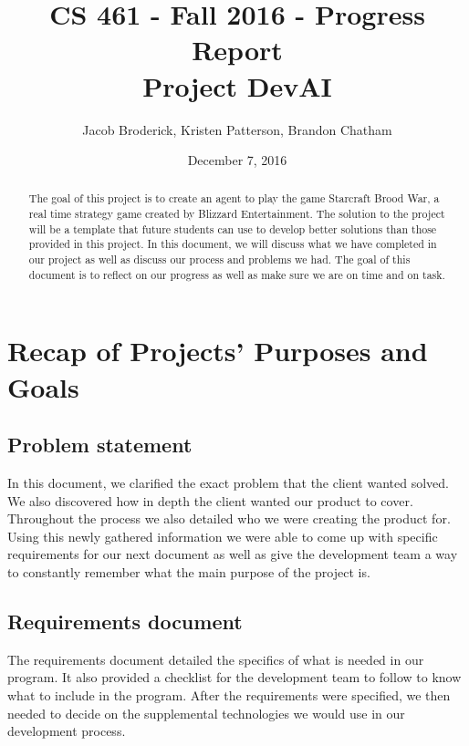 \documentclass[10pt,letterpaper,onecolumn,draftclsnofoot]{IEEEtran}
\begin{document}
\begin{titlepage}

  \title{CS 461 - Fall 2016 - Progress Report \\ Project DevAI}
  \author{Jacob Broderick, Kristen Patterson, Brandon Chatham}
  \date{December 7, 2016}
  \maketitle
  \vspace{4cm}
  \begin{abstract}
  	\noindent 
  	  	\noindent
	The goal of this project is to create an agent to play the game Starcraft Brood War, a real time strategy game created by Blizzard Entertainment. The solution to the project will be a template that future students can use to develop better solutions than those provided in this project. In this document, we will discuss what we have completed in our project as well as discuss our process and problems we had. The goal of this document is to reflect on our progress as well as make sure we are on time and on task.
   \end{abstract}
\end{titlepage}

\section{Recap of Projects' Purposes and Goals}
\subsection{Problem statement}
In this document, we clarified the exact problem that the client wanted solved. We also discovered how in depth the client wanted our product to cover. Throughout the process we also detailed who we were creating the product for. Using this newly gathered information we were able to come up with specific requirements for our next document as well as give the development team a way to constantly remember what the main purpose of the project is.

\subsection{Requirements document}
The requirements document detailed the specifics of what is needed in our program. It also provided a checklist for the development team to follow to know what to include in the program. After the requirements were specified, we then needed to decide on the supplemental technologies we would use in our development process.
\end{document}
